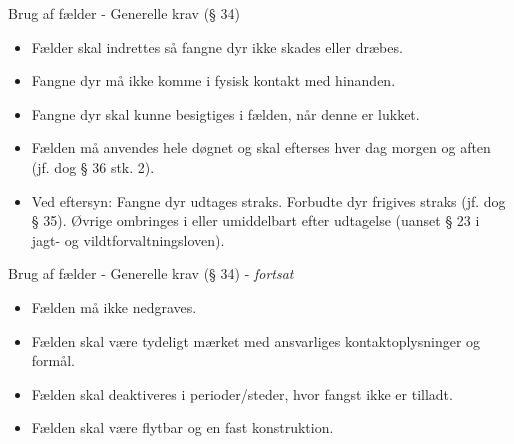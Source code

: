 \begin{frame}{Brug af fælder - Generelle krav (§ 34)}

\vspace{1em}

\small

\raggedright

\begin{itemize}
\itemsep0.6em

\item Fælder skal indrettes så fangne dyr ikke skades eller dræbes.

\item Fangne dyr må ikke komme i fysisk kontakt med hinanden.

\item Fangne dyr skal kunne besigtiges i fælden, når denne er lukket.

\item Fælden må anvendes hele døgnet og skal efterses hver dag morgen og aften (jf. dog § 36 stk. 2).

\item Ved eftersyn: Fangne dyr udtages straks. Forbudte dyr frigives straks (jf. dog § 35). Øvrige ombringes i eller umiddelbart efter udtagelse (uanset § 23 i jagt- og vildtforvaltningsloven).

\end{itemize}

\end{frame}

\begin{frame}{Brug af fælder - Generelle krav (§ 34) - \textit{fortsat}}

\vspace{1em}

\small

\raggedright

\begin{itemize}
\itemsep0.6em

\item Fælden må ikke nedgraves.

\item Fælden skal være tydeligt mærket med ansvarliges kontaktoplysninger og formål.

\item Fælden skal deaktiveres i perioder/steder, hvor fangst ikke er tilladt.

\item Fælden skal være flytbar og en fast konstruktion.

\end{itemize}

\vspace{1em}

\end{frame}

